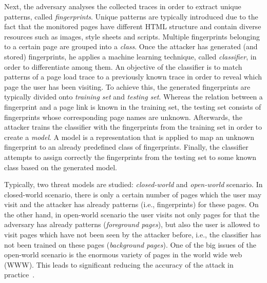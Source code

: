 Next, the adversary analyses the collected traces in order to extract unique patterns, called \emph{fingerprints}. Unique patterns are typically introduced due to the fact that the monitored pages have different \ac{HTML} structure and contain diverse resources such as images, style sheets and scripts. Multiple fingerprints belonging to a certain page are grouped into a \emph{class}. Once the attacker has generated (and stored) fingerprints, he applies a machine learning technique, called \emph{classifier}, in order to differentiate among them. An objective of the classifier is to match patterns of a page load trace to a previously known trace in order to reveal which page the user has been visiting. To achieve this, the generated fingerprints are typically divided onto \emph{training set} and \emph{testing set}. Whereas the relation between a fingerprint and a page link is known in the training set, the testing set consists of fingerprints whose corresponding page names are unknown. Afterwards, the attacker trains the classifier with the fingerprints from the training set in order to create a \emph{model}. A model is a representation that is applied to map an unknown fingerprint to an already predefined class of fingerprints. Finally, the classifier attempts to assign correctly the fingerprints from the testing set to some known class based on the generated model. %

Typically, two threat models are studied: \emph{closed-world} and \emph{open-world} scenario. In closed-world scenario, there is only a certain number of pages which the user may visit and the attacker has already patterns (i.e., fingerprints) for these pages. On the other hand, in open-world scenario the user visits not only pages for that the adversary has already patterns (\emph{foreground pages}), but also the user is allowed to visit pages which have not been seen by the attacker before, i.e., the classifier has not been trained on these pages (\emph{background pages}). One of the big issues of the open-world scenario is the enormous variety of pages in the world wide web (\acs{WWW}). This leads to significant reducing the accuracy of the attack in practice~\cite{juarez2014critical, Panchenko2016}. 



